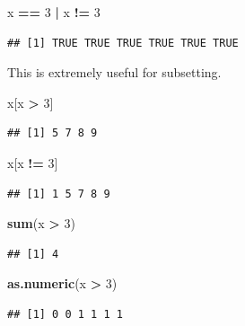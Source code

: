 \documentclass[]{book}
\newenvironment{Shaded}{\begin{snugshade}}{\end{snugshade}}
\newcommand{\KeywordTok}[1]{\textcolor[rgb]{0.13,0.29,0.53}{\textbf{#1}}}
\newcommand{\DecValTok}[1]{\textcolor[rgb]{0.00,0.00,0.81}{#1}}
\newcommand{\StringTok}[1]{\textcolor[rgb]{0.31,0.60,0.02}{#1}}
\newcommand{\OperatorTok}[1]{\textcolor[rgb]{0.81,0.36,0.00}{\textbf{#1}}}
\newcommand{\NormalTok}[1]{#1}
\theoremstyle{definition}
\theoremstyle{definition}
\theoremstyle{definition}
\theoremstyle{remark}
\begin{document}
\begin{Shaded}
\begin{Highlighting}[]
\NormalTok{x }\OperatorTok{==}\StringTok{ }\DecValTok{3} \OperatorTok{|}\StringTok{ }\NormalTok{x }\OperatorTok{!=}\StringTok{ }\DecValTok{3}
\end{Highlighting}
\end{Shaded}

\begin{verbatim}
## [1] TRUE TRUE TRUE TRUE TRUE TRUE
\end{verbatim}

This is extremely useful for subsetting.

\begin{Shaded}
\begin{Highlighting}[]
\NormalTok{x[x }\OperatorTok{>}\StringTok{ }\DecValTok{3}\NormalTok{]}
\end{Highlighting}
\end{Shaded}

\begin{verbatim}
## [1] 5 7 8 9
\end{verbatim}

\begin{Shaded}
\begin{Highlighting}[]
\NormalTok{x[x }\OperatorTok{!=}\StringTok{ }\DecValTok{3}\NormalTok{]}
\end{Highlighting}
\end{Shaded}

\begin{verbatim}
## [1] 1 5 7 8 9
\end{verbatim}

\begin{Shaded}
\begin{Highlighting}[]
\KeywordTok{sum}\NormalTok{(x }\OperatorTok{>}\StringTok{ }\DecValTok{3}\NormalTok{)}
\end{Highlighting}
\end{Shaded}

\begin{verbatim}
## [1] 4
\end{verbatim}

\begin{Shaded}
\begin{Highlighting}[]
\KeywordTok{as.numeric}\NormalTok{(x }\OperatorTok{>}\StringTok{ }\DecValTok{3}\NormalTok{)}
\end{Highlighting}
\end{Shaded}

\begin{verbatim}
## [1] 0 0 1 1 1 1
\end{verbatim}
\end{document}
